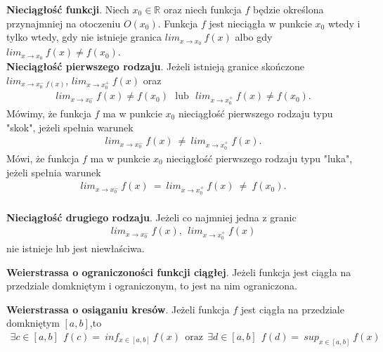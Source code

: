 \documentclass[12pt]{article}
\begin{document}
    \begin{definition}
        \textbf{Nieciągłość funkcji}. Niech $x_0 \in \mathbb{R}$ oraz niech funkcja $f$ będzie określona przynajmniej
        na otoczeniu $O(x_0)$. Funkcja $f$ jest nieciągła w punkcie $x_0$ wtedy i tylko wtedy, gdy nie istnieje
        granica $lim_{x \rightarrow x_0} ~ f(x)$ albo gdy $lim_{x \rightarrow x_0} ~ f(x) \neq f(x_0)$.
        \hfill \\

        \textbf{Nieciągłość pierwszego rodzaju}. Jeżeli istnieją granice skończone $lim_{x \rightarrow x^{-}_0 ~ f(x)}$,
        $lim_{x \rightarrow x^{+}_0} ~ f(x)$ oraz
        \begin{align*}
            lim_{x \rightarrow x^{-}_0} ~ f(x) \neq  f(x_0) ~~~ \text{lub} ~~~ lim_{x \rightarrow x^{+}_0} ~ f(x) \neq f(x_0).
        \end{align*}
        Mówimy, że funkcja $f$ ma w punkcie $x_0$ nieciągłość pierwszego rodzaju typu "skok", jeżeli spełnia warunek
        \begin{align*}
            lim_{x \rightarrow x^{-}_0} ~ f(x) ~ \neq ~ lim_{x \rightarrow x^{+}_0} ~ f(x).
        \end{align*}
        Mówi, że funkcja $f$ ma w punkcie $x_0$ nieciągłość pierwszego rodzaju typu "luka", jeżeli spełnia warunek
        \begin{align*}
            lim_{x \rightarrow x^{-}_0} ~ f(x) ~ = ~ lim_{x \rightarrow x^{+}_0} ~ f(x) ~ \neq ~ f(x_0).
        \end{align*}
        \hfill \\

        \textbf{Nieciągłość drugiego rodzaju}. Jeżeli co najmniej jedna z granic
        \begin{align*}
            lim_{x \rightarrow x^{-}_0} ~ f(x), ~~ lim_{x \rightarrow x^{+}_0} ~ f(x)
        \end{align*}
        nie istnieje lub jest niewłaściwa.
    \end{definition}

    \begin{theorem}
        \textbf{Weierstrassa o ograniczoności funkcji ciągłej}. Jeżeli funkcja jest ciągła na przedziale domkniętym
        i ograniczonym, to jest na nim ograniczona.
    \end{theorem}

    \begin{theorem}
        \textbf{Weierstrassa o osiąganiu kresów}. Jeżeli funkcja $f$ jest ciągła na przedziale domkniętym $[a, b]$,to
        \begin{align*}
            \exists c \in [a,b] ~~ f(c) = ~ inf_{x \in [a,b]} ~ f(x) ~~ \text{oraz} ~~ \exists d \in [a,b] ~~ f(d) = ~ sup_{x \in [a,b]} ~ f(x)
        \end{align*}
    \end{theorem}
\end{document}
